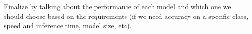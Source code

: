 Finalize by talking about the performance of each model and which one we should choose based on the requirements (if we need accuracy on a specific class, speed and inference time, model size, etc).

